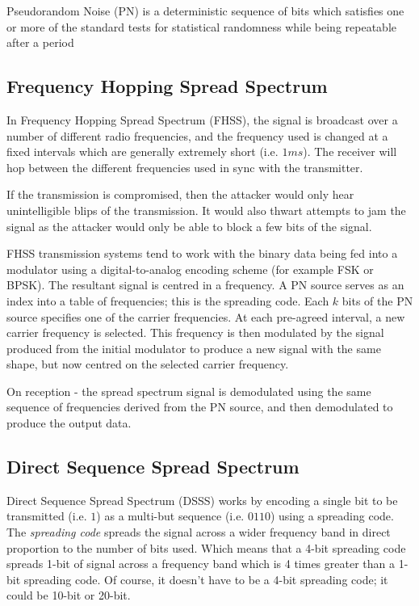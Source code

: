 \begin{define}
    \item[Pseudorandom Noise] (PN) is a deterministic sequence of bits which satisfies one or more of the standard tests for statistical randomness while being repeatable after a period
\end{define}

\subsection{Frequency Hopping Spread Spectrum}
In Frequency Hopping Spread Spectrum (FHSS), the signal is broadcast over a number of different radio frequencies, and the frequency used is changed at a fixed intervals which are generally extremely short (i.e. $1 ms$). The receiver will hop between the different frequencies used in sync with the transmitter.

If the transmission is compromised, then the attacker would only hear unintelligible blips of the transmission. It would also thwart attempts to jam the signal as the attacker would only be able to block a few bits of the signal. 

FHSS transmission systems tend to work with the binary data being fed into a modulator using a digital-to-analog encoding scheme (for example FSK or BPSK). The resultant signal is centred in a frequency. A PN source serves as an index into a table of frequencies; this is the spreading code. Each $k$ bits of the PN source specifies one of the carrier frequencies. At each pre-agreed interval, a new carrier frequency is selected. This frequency is then modulated by the signal produced from the initial modulator to produce a new signal with the same shape, but now centred on the selected carrier frequency.

On reception - the spread spectrum signal is demodulated using the same sequence of frequencies derived from the PN source, and then demodulated to produce the output data. 

\subsection{Direct Sequence Spread Spectrum}
Direct Sequence Spread Spectrum (DSSS) works by encoding a single bit to be transmitted (i.e. $1$) as a multi-but sequence (i.e. $0110$) using a spreading code. The \textit{spreading code} spreads the signal across a wider frequency band in direct proportion to the number of bits used. Which means that a 4-bit spreading code spreads 1-bit of signal across a frequency band which is 4 times greater than a 1-bit spreading code. Of course, it doesn't have to be a 4-bit spreading code; it could be 10-bit or 20-bit. 

